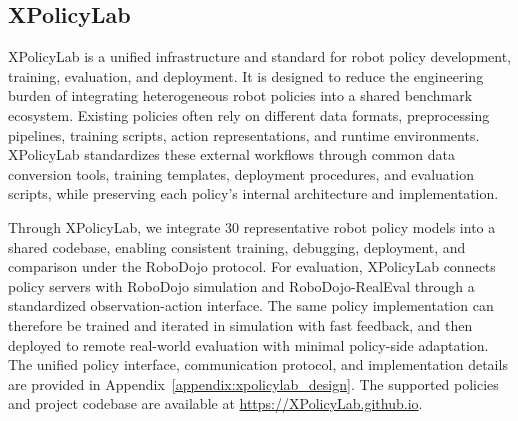 \subsection{XPolicyLab}
\label{sec:xpolicylab}

XPolicyLab is a unified infrastructure and standard for robot policy development, training, evaluation, and deployment. It is designed to reduce the engineering burden of integrating heterogeneous robot policies into a shared benchmark ecosystem. Existing policies often rely on different data formats, preprocessing pipelines, training scripts, action representations, and runtime environments. XPolicyLab standardizes these external workflows through common data conversion tools, training templates, deployment procedures, and evaluation scripts, while preserving each policy's internal architecture and implementation.

Through XPolicyLab, we integrate 30 representative robot policy models into a shared codebase, enabling consistent training, debugging, deployment, and comparison under the RoboDojo protocol. For evaluation, XPolicyLab connects policy servers with RoboDojo simulation and RoboDojo-RealEval through a standardized observation-action interface. The same policy implementation can therefore be trained and iterated in simulation with fast feedback, and then deployed to remote real-world evaluation with minimal policy-side adaptation. The unified policy interface, communication protocol, and implementation details are provided in Appendix~\ref{appendix:xpolicylab_design}. The supported policies and project codebase are available at \href{https://XPolicyLab.github.io}{https://XPolicyLab.github.io}.